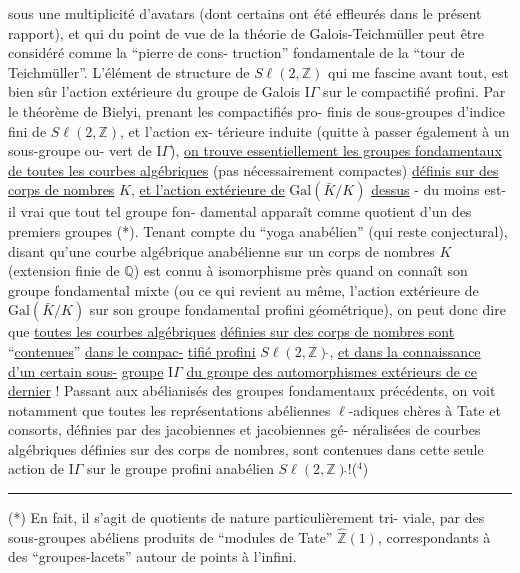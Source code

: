 
sous une multiplicité d'avatars (dont certains ont été effleurés
dans le présent rapport), et qui du point de vue de la théorie de
Galois-Teichmüller peut être considéré comme la ``pierre de cons-%
truction'' fondamentale de la ``tour de Teichmüller''. L'élément de
structure de $S\ell(2,\mathbb{Z})$ qui me fascine avant tout, est bien sûr
l'action extérieure du groupe de Galois $\mathrm{I}\!\Gamma$ sur le compactifié
profini. Par le théorème de Bielyi, prenant les compactifiés pro-%
finis de sous-groupes d'indice fini de $S\ell(2,\mathbb{Z})$, et l'action ex-%
térieure induite (quitte à passer également à un sous-groupe ou-%
vert de $\mathrm{I}\!\Gamma$), \uline{on trouve essentiellement les groupes fondamentaux}
\uline{de toutes les courbes algébriques} (pas nécessairement compactes)
\uline{définis sur des corps de nombres} $K$, \uline{et l'action extérieure de}
$\mathrm{Gal}(\bar{K}/K)$ \uline{dessus} - du moins est-il vrai que tout tel groupe fon-%
 damental apparaît comme quotient d'un des premiers groupes (*).
Tenant compte du ``yoga anabélien'' (qui reste conjectural), disant
qu'une courbe algébrique anabélienne sur un corps de nombres $K$
(extension finie de $\mathbb{Q}$) est connu à isomorphisme près quand on
connaît son groupe fondamental mixte (ou ce qui revient au même,
l'action extérieure de $\mathrm{Gal}(\bar{K}/K)$ sur son groupe fondamental profini
géométrique), on peut donc dire que \uline{toutes les courbes algébriques}
\uline{définies sur des corps de nombres sont} ``\uline{contenues}'' \uline{dans le compac-}%
\uline{tifié profini} $S\ell(2,\mathbb{Z})\hat{}$, \uline{et dans la connaissance d'un certain sous-}%
\uline{groupe} $\mathrm{I}\!\Gamma$ \uline{du groupe des automorphismes extérieurs de ce dernier} !
Passant aux abélianisés des groupes fondamentaux précédents, on voit
notamment que toutes les représentations abéliennes $\ell$-adiques chères
à Tate et consorts, définies par des jacobiennes et jacobiennes gé-%
néralisées de courbes algébriques définies sur des corps de nombres,
sont contenues dans cette seule action de $\mathrm{I}\!\Gamma$ sur le groupe profini
anabélien $S\ell(2,\mathbb{Z})\hat{}$!($^{4}$)

\rule{5cm}{0.4pt}

(*) En fait, il s'agit de quotients de nature particulièrement tri-%
 viale, par des sous-groupes abéliens produits de ``modules de Tate''
$\hat{\mathbb{Z}}(1)$, correspondants à des ``groupes-lacets'' autour de points à l'infini.

